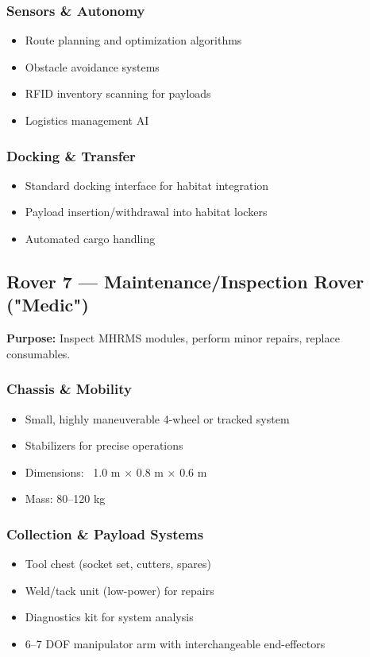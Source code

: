 \documentclass[12pt, a4paper]{article}
\begin{document}
\subsubsection{Sensors \& Autonomy}
\begin{itemize}
    \item Route planning and optimization algorithms
    \item Obstacle avoidance systems
    \item RFID inventory scanning for payloads
    \item Logistics management AI
\end{itemize}

\subsubsection{Docking \& Transfer}
\begin{itemize}
    \item Standard docking interface for habitat integration
    \item Payload insertion/withdrawal into habitat lockers
    \item Automated cargo handling
\end{itemize}

\subsection{Rover 7 — Maintenance/Inspection Rover ("Medic")}

\textbf{Purpose:} Inspect MHRMS modules, perform minor repairs, replace consumables.

\subsubsection{Chassis \& Mobility}
\begin{itemize}
    \item Small, highly maneuverable 4-wheel or tracked system
    \item Stabilizers for precise operations
    \item Dimensions: ~1.0 m × 0.8 m × 0.6 m
    \item Mass: 80–120 kg
\end{itemize}

\subsubsection{Collection \& Payload Systems}
\begin{itemize}
    \item Tool chest (socket set, cutters, spares)
    \item Weld/tack unit (low-power) for repairs
    \item Diagnostics kit for system analysis
    \item 6–7 DOF manipulator arm with interchangeable end-effectors
\end{itemize}
\end{document}
